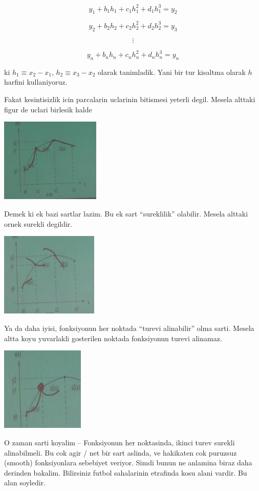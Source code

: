 \documentclass[12pt,fleqn]{article}\usepackage{common}
\begin{document}
\[ y_1 + b_1h_1 + c_1h_1^2 + d_1h_1^3 = y_2 \]

\[ y_2 + b_2h_2 + c_2h_2^2 + d_2h_2^3 = y_3 \]

\[ \vdots \]

\[ y_n + b_nh_n + c_nh_n^2 + d_nh_n^3 = y_n \]

ki $h_1 \equiv x_2 - x_1$, $h_2 \equiv x_3 - x_2$ olarak tanimladik. Yani bir tur kisaltma 
olarak $h$ harfini kullaniyoruz. 

Fakat kesintisizlik icin parcalarin uclarinin bitismesi yeterli
degil. Mesela alttaki figur de uclari birlesik halde

\includegraphics[height=4cm]{spline3.png}

Demek ki ek bazi sartlar lazim. Bu ek sart ``sureklilik'' olabilir. Mesela
alttaki ornek surekli degildir.

\includegraphics[height=4cm]{spline5.png}

Ya da daha iyisi, fonksiyonun her noktada ``turevi alinabilir'' olma
sarti. Mesela altta koyu yuvarlakli gosterilen noktada fonksiyonun turevi
alinamaz.

\includegraphics[height=4cm]{spline4.png}

O zaman sarti koyalim -- Fonksiyonun her noktasinda, ikinci turev surekli
alinabilmeli. Bu cok agir / net bir sart aslinda, ve hakikaten cok puruzsuz
(smooth) fonksiyonlara sebebiyet veriyor. Simdi bunun ne anlamina biraz
daha derinden bakalim. Bilirsiniz futbol sahalarinin etrafinda kosu alani
vardir. Bu alan soyledir.
\end{document}
